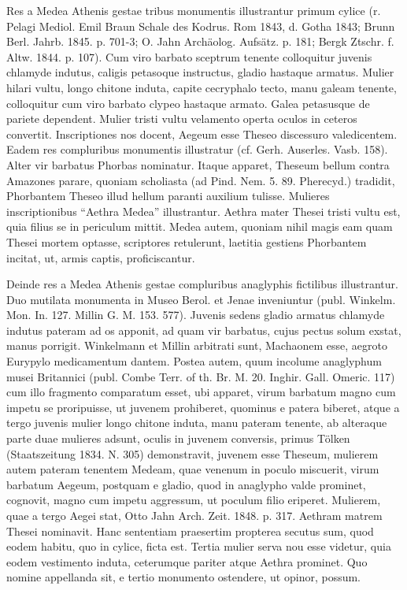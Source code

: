 \documentclass[landscape, a4paper, 11pt, oneside, polutonikogreek, german]{article}
\begin{document}
Res a Medea Athenis gestae tribus monumentis illustrantur primum cylice (r. Pelagi Mediol. Emil Braun Schale des Kodrus. Rom 1843, d. Gotha 1843; Brunn Berl. Jahrb. 1845. p. 701-3; O. Jahn Archäolog. Aufsätz. p. 181; Bergk Ztschr. f. Altw. 1844. p. 107). Cum viro barbato sceptrum tenente colloquitur juvenis chlamyde indutus, caligis petasoque instructus, gladio hastaque armatus. Mulier hilari vultu, longo chitone induta, capite cecryphalo tecto, manu galeam tenente, colloquitur cum viro barbato clypeo hastaque armato. Galea petasusque de pariete dependent. Mulier tristi vultu velamento operta oculos in ceteros convertit. Inscriptiones nos docent, Aegeum esse Theseo discessuro valedicentem. Eadem res compluribus monumentis illustratur (cf. Gerh. Auserles. Vasb. 158). Alter vir barbatus Phorbas nominatur. Itaque apparet, Theseum bellum contra Amazones parare, quoniam scholiasta (ad Pind. Nem. 5. 89. Pherecyd.) tradidit, Phorbantem Theseo illud hellum paranti auxilium tulisse. Mulieres inscriptionibus "`Aethra Medea"' illustrantur. Aethra mater Thesei tristi vultu est, quia filius se in periculum mittit. Medea autem, quoniam nihil magis eam quam Thesei mortem optasse, scriptores retulerunt, laetitia gestiens Phorbantem incitat, ut, armis captis, proficiscantur.

Deinde res a Medea Athenis gestae compluribus anaglyphis fictilibus illustrantur. Duo mutilata monumenta in Museo Berol. et Jenae inveniuntur (publ. Winkelm. Mon. In. 127. Millin G. M. 153. 577). Juvenis sedens gladio armatus chlamyde indutus pateram ad os apponit, ad quam vir barbatus, cujus pectus solum exstat, manus porrigit. Winkelmann et Millin arbitrati sunt, Machaonem esse, aegroto Eurypylo medicamentum dantem. Postea autem, quum incolume anaglyphum musei Britannici (publ. Combe Terr. of th. Br. M. 20. Inghir. Gall. Omeric. 117) cum illo fragmento comparatum esset, ubi apparet, virum barbatum magno cum impetu se proripuisse, ut juvenem prohiberet, quominus e patera biberet, atque a tergo juvenis mulier longo chitone induta, manu pateram tenente, ab alteraque parte duae mulieres adsunt, oculis in juvenem conversis, primus Tölken (Staatszeitung 1834. N. 305) demonstravit, juvenem esse Theseum, mulierem autem pateram tenentem Medeam, quae venenum in poculo miscuerit, virum barbatum Aegeum, postquam e gladio, quod in anaglypho valde prominet, cognovit, magno cum impetu aggressum, ut poculum filio eriperet. Mulierem, quae a tergo Aegei stat, Otto Jahn Arch. Zeit. 1848. p. 317. Aethram matrem Thesei nominavit. Hanc sententiam praesertim propterea secutus sum, quod eodem habitu, quo in cylice, ficta est. Tertia mulier serva nou esse videtur, quia eodem vestimento induta, ceterumque pariter atque Aethra prominet. Quo nomine appellanda sit, e tertio monumento ostendere, ut opinor, possum.
\end{document}
